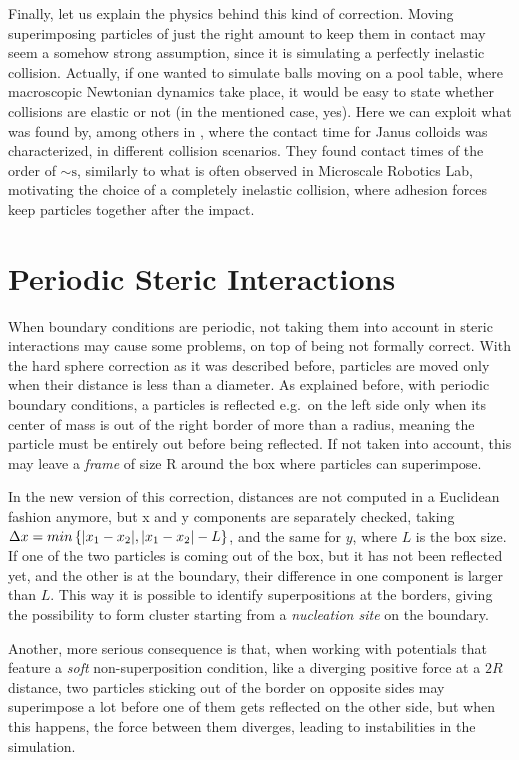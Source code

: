 \documentclass[../../master_thesis_np.tex]{subfiles}
\begin{document}
	Finally, let us explain the physics behind this kind of correction. Moving superimposing particles of just the right amount to keep them in contact may seem a somehow strong assumption, since it is simulating a perfectly inelastic collision. Actually, if one wanted to simulate balls moving on a pool table, where macroscopic Newtonian dynamics take place, it would be easy to state whether collisions are elastic or not (in the mentioned case, yes). Here we can exploit what was found by, among others \citeauthor{singh_pair_2024} in \cite{singh_pair_2024}, where the contact time for Janus colloids was characterized, in different collision scenarios. They found contact times of the order of $\sim \text{s}$, similarly to what is often observed in Microscale Robotics Lab, motivating the choice of a completely inelastic collision, where adhesion forces keep particles together after the impact. 

	\section{Periodic Steric Interactions}
	When boundary conditions are periodic, not taking them into account in steric interactions may cause some problems, on top of being not formally correct. With the hard sphere correction as it was described before, particles are moved only when their distance is less than a diameter. As explained before, with periodic boundary conditions, a particles is reflected e.g.~on the left side only when its center of mass is out of the right border of more than a radius, meaning the particle must be entirely out before being reflected. If not taken into account, this may leave a \emph{frame} of size R around the box where particles can superimpose. 
	
	In the new version of this correction, distances are not computed in a Euclidean fashion anymore, but x and y components are separately checked, taking $\Delta x = min \left\{ \abs{x_1-x_2}, \abs{x_1-x_2}-L \right\}$, and the same for $y$, where $L$ is the box size. If one of the two particles is coming out of the box, but it has not been reflected yet, and the other is at the boundary, their difference in one component is larger than $L$. This way it is possible to identify superpositions at the borders, giving the possibility to form cluster starting from a \emph{nucleation site} on the boundary. 
	
	Another, more serious consequence is that, when working with potentials that feature a \emph{soft} non-superposition condition, like a diverging positive force at a $2R$ distance, two particles sticking out of the border on opposite sides may superimpose a lot before one of them gets reflected on the other side, but when this happens, the force between them diverges, leading to instabilities in the simulation.
	
\end{document}
